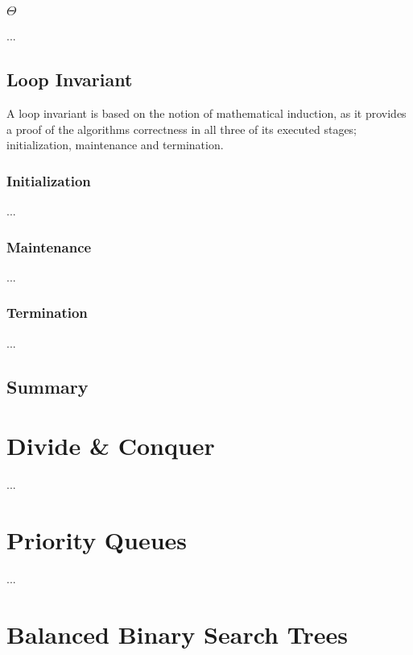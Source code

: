 \documentclass[11pt,english]{book}
\begin{document}
\subsection{$\Theta$}
\label{ch:definitions|sec:asymptotic-notation|sub:theta}
...

\section{Loop Invariant}
\label{ch:definitions|sec:loop-invariant}
A loop invariant is based on the notion of mathematical induction, as it
provides a proof of the algorithms correctness in all three of its executed
stages; initialization, maintenance and termination.

\subsection{Initialization}
...

\subsection{Maintenance}
...

\subsection{Termination}
...

\section{Summary}
\label{ch:definitions|sec:asymptotic-notation|sec:summary}


\chapter{Divide \& Conquer}
\label{ch:divideandconquer}
...



\chapter{Priority Queues}
\label{ch:priorityqueyes}
...



\chapter{Balanced Binary Search Trees}
\label{ch:bbstrees}
\end{document}
